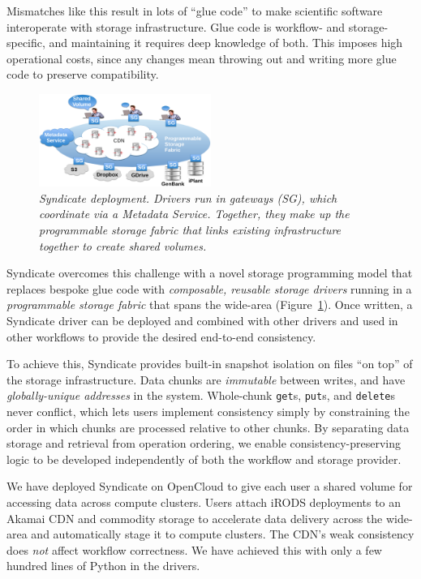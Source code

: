 \documentclass[letterpaper,twocolumn,10pt]{article}
\begin{document}
Mismatches like this result in lots of ``glue code'' to make
scientific software interoperate with storage infrastructure.  Glue code is
workflow- and storage-specific, and maintaining it requires deep knowledge of
both.  This imposes high operational costs, since
any changes mean throwing out and
writing more glue code to preserve compatibility.

\begin{figure}[ht!]
   \centering
   \includegraphics[width=0.5\textwidth]{fig2.pdf}
   \caption{\it Syndicate deployment.  Drivers run in gateways (SG), which
   coordinate via a Metadata Service.  Together, they make up the programmable
   storage fabric that links existing infrastructure together to create shared
   volumes.}
   \label{fig:syndicate-overview}
\end{figure}

Syndicate overcomes this challenge with a novel storage programming model that
replaces bespoke glue code with \emph{composable, reusable storage drivers}
running in a \emph{programmable storage fabric} that spans the wide-area
(Figure~\ref{fig:syndicate-overview}).
Once written, a Syndicate driver can be deployed and combined with other drivers
and used in other workflows to provide the desired end-to-end consistency.

To achieve this, Syndicate provides built-in snapshot isolation on files ``on top'' of 
the storage infrastructure.  Data chunks are \emph{immutable}
between writes, and have \emph{globally-unique addresses} in the system.
Whole-chunk \texttt{get}s, \texttt{put}s, and \texttt{delete}s never conflict,
which lets users implement consistency simply by constraining the order in which
chunks are processed relative to other chunks.  By separating data storage and
retrieval from operation ordering, we enable consistency-preserving logic to be developed
independently of both the workflow and storage provider.

We have deployed Syndicate on OpenCloud to give each user a shared volume
for accessing data across compute clusters.  Users attach iRODS deployments
to an Akamai CDN and commodity storage to accelerate data delivery across the
wide-area and automatically stage it to compute clusters.  The CDN's weak
consistency does \emph{not} affect workflow correctness.  We have achieved this
with only a few hundred lines of Python in the drivers.
\end{document}
